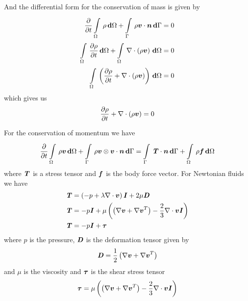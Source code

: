 And the differential form for the conservation of mass is given by
\begin{equation}
  \begin{split}
    \delby{}{t}\gint{\Omega}{}{\rho}{\Omega}+\gint{\Gamma}{}{\dotprod{\rho\vectr{v}}{\vectr{n}}}{\Gamma}&=0
    \\
    \gint{\Omega}{}{\delby{\rho}{t}}{\Omega}+\gint{\Omega}{}{\divergence{}{\pbrac{\rho\vectr{v}}}}{\Omega}&=0\\
    \gint{\Omega}{}{\pbrac{\delby{\rho}{t}+\divergence{}{\pbrac{\rho\vectr{v}}}}}{\Omega}&=0
  \end{split}
\end{equation}
which gives us
\begin{equation}
  \delby{\rho}{t}+\divergence{}{\pbrac{\rho\vectr{v}}}=0
  \label{eqn:differentialconservationofmass}
\end{equation}

For the conservation of momentum we have
\begin{equation}
   \dfrac{\partial }{\partial t}   \displaystyle\int\limits_{\Omega}^{} \,\rho\boldsymbol{v}\, \boldsymbol{\mathrm{d}} \Omega +  \displaystyle\int\limits_{\Gamma}^{} \, \rho\boldsymbol{v} \otimes \boldsymbol{v} \cdot\boldsymbol{n}\, \boldsymbol{\mathrm{d}} \Gamma =  \displaystyle\int\limits_{\Gamma}^{} \,\boldsymbol{\mathit{T}}\cdot\boldsymbol{n}\, \boldsymbol{\mathrm{d}} \Gamma +  \displaystyle\int\limits_{\Omega}^{} \,\rho\boldsymbol{f}\, \boldsymbol{\mathrm{d}} \Omega 
\end{equation}
where $\boldsymbol{\mathit{T}}$ is a stress tensor and $\boldsymbol{f}$ is the body force vector. For Newtonian fluids we have
\begin{equation}
  \begin{split}
    \tensor{T}&=\pbrac{-p+\lambda\divergence{}{\vectr{v}}}\tensor{I}+2\mu\tensor{D} \\
    \tensor{T}&=-p\tensor{I}+\mu\pbrac{\pbrac{\gradient{}{\vectr{v}}+\transpose{\gradient{}{\vectr{v}}}}-
      \frac{2}{3}\divergence{}{\vectr{v}}\tensor{I}}\\
    \tensor{T}&=-p\tensor{I}+\tensor{\tau}
  \end{split}
\end{equation}
where $p$ is the pressure, $\boldsymbol{\mathit{D}}$ is the deformation tensor given by
\begin{equation}
  \tensor{D}=\frac{1}{2}\pbrac{\gradient{}{\vectr{v}}+\transpose{\gradient{}{\vectr{v}}}}
\end{equation}
and $\mu$ is
the viscosity and $\boldsymbol{\mathit{\tau}}$ is the shear stress tensor \ie
\begin{equation}
  \tensor{\tau}=\mu\pbrac{\pbrac{\gradient{}{\vectr{v}}+\transpose{\gradient{}{\vectr{v}}}}-
    \frac{2}{3}\divergence{}{\vectr{v}}\tensor{I}}
\end{equation}

